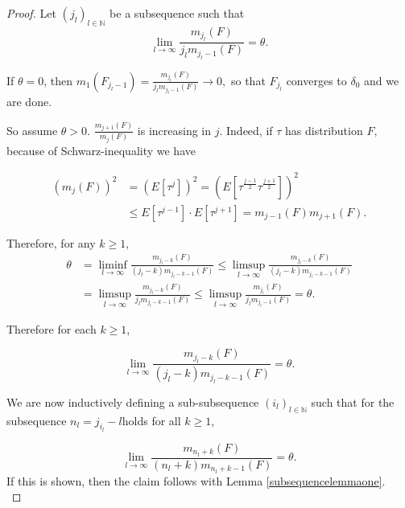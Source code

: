 \documentclass[12pt,a4paper]{scrartcl}
\numberwithin{equation}{section}
\newcommand{\N}{\mathbb{N}} %
\begin{document}
\begin{proof}
Let $\left(j_l\right)_{l \in \N}$ be a subsequence such that
\begin{equation}
\lim_{l \to \infty} \frac{m_{j_l}\left(F\right)}{j_l m_{j_l-1}\left(F\right)} = \theta.
\end{equation}

If $ \theta = 0 $, then $ m_1\left(F_{j_l-1}\right) = \frac{m_{j_l}\left(F\right)}{j_l m_{j_l-1}\left(F\right)} \to 0, $ so that $F_{j_l}$ converges to $\delta_0$ and we are done.

So assume $ \theta > 0.$
$\frac{m_{j+1}\left(F\right)}{m_{j}\left(F\right)} $ is increasing in $j.$ Indeed, if $\tau$ has distribution $F,$ because of Schwarz-inequality we have

\begin{align*}
\left(m_j\left(F\right)\right)^2 &= \left(E\left[\tau^j\right]\right)^2 = \left(E\left[\tau^{\frac{j-1}{2}} \tau^{\frac{j+1}{2}}\right]\right)^2 \\
& \leq E\left[\tau^{j-1}\right] \cdot E\left[\tau^{j+1}\right] = m_{j-1}\left(F\right) m_{j+1}\left(F\right).
\end{align*}

Therefore, for any $k \geq 1$,
\begin{align*}
\theta &= \liminf_{l \to \infty} \frac{m_{j_l-k}\left(F\right)}{\left(j_l-k\right) m_{j_l-k-1}\left(F\right)} \leq \limsup_{l \to \infty} \frac{m_{j_l-k}\left(F\right)}{\left(j_l-k\right) m_{j_l-k-1}\left(F\right)} \\
& = \limsup_{l \to \infty} \frac{m_{j_l-k}\left(F\right)}{j_l m_{j_l-k-1}\left(F\right)} \leq \limsup_{l \to \infty} \frac{m_{j_l}\left(F\right)}{j_l m_{j_l-1}\left(F\right)} = \theta.
\end{align*}

Therefore for each $ k \geq 1 $,

\begin{equation}
\label{eq:diagonalargument}
\lim_{l \to \infty} \frac{m_{j_l-k}\left(F\right)}{\left(j_l-k\right) m_{j_l-k-1}\left(F\right)} = \theta.
\end{equation}

We are now inductively defining a sub-subsequence $ \left(i_l\right)_{l \in \N}$ such that for the subsequence $n_l = j_{i_l} - l$holds for all $k \geq 1$,

\begin{equation}
\lim_{l \to \infty} \frac{m_{n_l+k}\left(F\right)}{\left(n_l+k\right) m_{n_l+k-1}\left(F\right)} = \theta.
\end{equation}
If this is shown, then the claim follows with Lemma \ref{subsequencelemmaone}. \\[1ex]


\end{proof}
\end{document}
